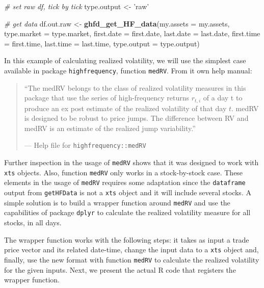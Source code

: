 \documentclass[11pt,]{book}
\newenvironment{Shaded}{\begin{snugshade}}{\end{snugshade}}
\newcommand{\KeywordTok}[1]{\textcolor[rgb]{0.27,0.27,0.27}{\textbf{#1}}}
\newcommand{\DataTypeTok}[1]{\textcolor[rgb]{0.27,0.27,0.27}{#1}}
\newcommand{\StringTok}[1]{\textcolor[rgb]{0.5,0.5,0.5}{#1}}
\newcommand{\CommentTok}[1]{\textcolor[rgb]{0.56,0.35,0.01}{\textit{#1}}}
\newcommand{\NormalTok}[1]{#1}
\begin{document}
\begin{Shaded}
\begin{Highlighting}[]
\CommentTok{# set raw df, tick by tick}
\NormalTok{type.output <-}\StringTok{ 'raw'}

\CommentTok{# get data}
\NormalTok{df.out.raw <-}\StringTok{ }\KeywordTok{ghfd_get_HF_data}\NormalTok{(}\DataTypeTok{my.assets =}\NormalTok{ my.assets,}
                               \DataTypeTok{type.market =}\NormalTok{ type.market,}
                               \DataTypeTok{first.date =}\NormalTok{ first.date,}
                               \DataTypeTok{last.date =}\NormalTok{ last.date,}
                               \DataTypeTok{first.time =}\NormalTok{ first.time,}
                               \DataTypeTok{last.time =}\NormalTok{ last.time,}
                               \DataTypeTok{type.output =}\NormalTok{ type.output)}
\end{Highlighting}
\end{Shaded}

In this example of calculating realized volatility, we will use the
simplest case available in package \texttt{highfrequency}, function
\texttt{medRV}. From it own help manual:

\begin{quote}
``The medRV belongs to the class of realized volatility measures in this
package that use the series of high-frequency returns \(r_{t,i}\) of a
day t to produce an ex post estimate of the realized volatility of that
day \(t\). medRV is designed to be robust to price jumps. The difference
between RV and medRV is an estimate of the realized jump variability.''

--- Help file for \texttt{highfrequency::medRV}
\end{quote}

Further inspection in the usage of \texttt{medRV} shows that it was
designed to work with \texttt{xts} objects. Also, function
\texttt{medRV} only works in a stock-by-stock case. These elements in
the usage of \texttt{medRV} requires some adaptation since the
\texttt{dataframe} output from \texttt{getHFData} is not a \texttt{xts}
object and it will include several stocks. A simple solution is to build
a wrapper function around \texttt{medRV} and use the capabilities of
package \texttt{dplyr} to calculate the realized volatility measure for
all stocks, in all days.

The wrapper function works with the following steps: it takes as input a
trade price vector and its related date-time, change the input data to a
\texttt{xts} object and, finally, use the new format with function
\texttt{medRV} to calculate the realized volatility for the given
inputs. Next, we present the actual R code that registers the wrapper
function.
\end{document}
